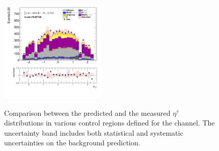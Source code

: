 \begin{figure}[!htp]
\begin{center}
			\includegraphics[width=0.45\textwidth]{chapters/chapter6_HPlus/images/taujets/tau_0_eta_BVETO_MT100.png} \\
			\end{center}
			\caption{
			Comparison between the predicted and the measured $\eta^{\tau}$ distributions in various control regions defined for the \taujets channel. The uncertainty band includes both statistical and systematic uncertainties on the background prediction. 
			}
			\label{fig:bkg-tau-eta-taujets}
		\end{figure}


